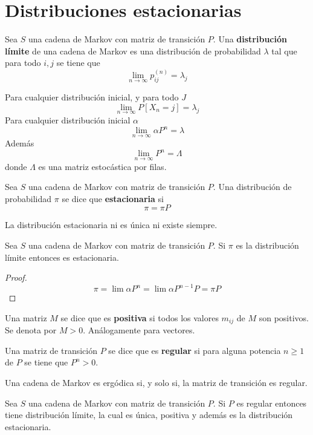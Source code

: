 \documentclass[PREyA.tex]{subfiles}
\begin{document}
\section{Distribuciones estacionarias}
\begin{defi}
Sea $S$ una cadena de Markov con matriz de transición $P$. Una \textbf{distribución límite} de una cadena de Markov es una distribución de probabilidad $\lambda$ tal que para todo $i,j$ se tiene que
$$
\lim_{n\to \infty} p_{ij}^{(n)}=\lambda_j
$$
\end{defi}
\begin{prop}
Para cualquier distribución inicial, y para todo $J$
$$
\lim_{n\to \infty} P[X_n=j]=\lambda_j
$$
Para cualquier distribución inicial $\alpha$
$$
\lim_{n\to \infty} \alpha P^n = \lambda
$$
Además
$$
\lim_{n\to \infty}  P^n = \Lambda
$$
donde $\Lambda$ es una matriz estocástica por filas.
\end{prop}
\begin{defi}
Sea $S$ una cadena de Markov con matriz de transición $P$. Una distribución de probabilidad $\pi$ se dice que \textbf{estacionaria} si 
$$
\pi = \pi P
$$
\end{defi}
\begin{nota}
La distribución estacionaria ni es única ni existe siempre.
\end{nota}
\begin{prop}
Sea $S$ una cadena de Markov con matriz de transición $P$. Si $\pi$ es la distribución límite entonces es estacionaria.
\end{prop}
\begin{proof}
$$
\pi = \lim \alpha P^{n} = \lim \alpha P^{n-1} P = \pi P
$$
\end{proof}
\begin{defi}
Una matriz $M$ se dice que es \textbf{positiva} si todos los valores $m_{ij}$ de $M$ son positivos. Se denota por $M>0$. Análogamente para vectores.
\end{defi}
\begin{defi} Una matriz de transición $P$ se dice que es \textbf{regular} si para alguna potencia $n\geq 1$ de $P$ se tiene que $P^n>0$.
\end{defi}
\begin{theorem}
Una cadena de Markov es ergódica si, y solo si, la matriz de transición es regular.
\end{theorem}
\begin{theorem}
Sea $S$ una cadena de Markov con matriz de transición $P$. Si $P$ es regular entonces tiene distribución límite, la cual es única, positiva y además es la distribución estacionaria.
\end{theorem}
\end{document}
